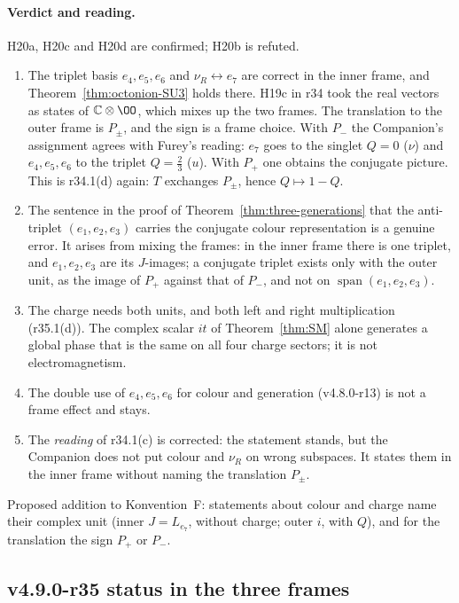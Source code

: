 \paragraph{Verdict and reading.}
H20a, H20c and H20d are confirmed; H20b is refuted.
\begin{enumerate}[leftmargin=2em]
\item The triplet basis \(e_4,e_5,e_6\) and \(\nu_R\leftrightarrow e_7\) are correct in the inner frame, and
Theorem~\ref{thm:octonion-SU3} holds there.  H19c in r34 took the real vectors as states of \(\mathbb C\otimes\OO\), which mixes up
the two frames.  The translation to the outer frame is \(P_\pm\), and the sign is a frame choice.  With \(P_-\) the Companion's
assignment agrees with Furey's reading: \(e_7\) goes to the singlet \(Q=0\) (\(\nu\)) and \(e_4,e_5,e_6\) to the triplet
\(Q=\tfrac23\) (\(u\)).  With \(P_+\) one obtains the conjugate picture.  This is r34.1(d) again: \(T\) exchanges \(P_\pm\), hence
\(Q\mapsto1-Q\).
\item The sentence in the proof of Theorem~\ref{thm:three-generations} that the anti-triplet \((e_1,e_2,e_3)\) carries the
conjugate colour representation is a genuine error.  It arises from mixing the frames: in the inner frame there is one triplet,
and \(e_1,e_2,e_3\) are its \(J\)-images; a conjugate triplet exists only with the outer unit, as the image of \(P_+\) against that
of \(P_-\), and not on \(\operatorname{span}(e_1,e_2,e_3)\).
\item The charge needs both units, and both left and right multiplication (r35.1(d)).  The complex scalar \(it\) of
Theorem~\ref{thm:SM} alone generates a global phase that is the same on all four charge sectors; it is not electromagnetism.
\item The double use of \(e_4,e_5,e_6\) for colour and generation (v4.8.0-r13) is not a frame effect and stays.
\item The \emph{reading} of r34.1(c) is corrected: the statement stands, but the Companion does not put colour and \(\nu_R\) on
wrong subspaces.  It states them in the inner frame without naming the translation \(P_\pm\).
\end{enumerate}
Proposed addition to Konvention~F: statements about colour and charge name their complex unit (inner \(J=L_{e_7}\), without
charge; outer \(i\), with \(Q\)), and for the translation the sign \(P_+\) or \(P_-\).

\subsection*{v4.9.0-r35 status in the three frames}
\label{subsec:v490-r35-frames}

